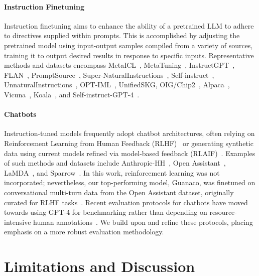 \paragraph{Instruction Finetuning} Instruction finetuning aims to enhance the ability of a pretrained LLM to adhere to directives supplied within prompts. This is accomplished by adjusting the pretrained model using input-output samples compiled from a variety of sources, training it to output desired results in response to specific inputs. Representative methods and datasets encompass MetaICL~\citep{min2021metaicl}, MetaTuning~\citep{zhong2021adapting}, InstructGPT~\citep{ouyang2022training}, FLAN~\citep{wei2021finetuned,chung2022scaling}, PromptSource~\citep{bach2022promptsource}, Super-NaturalInstructions~\citep{wang2022super,sanh2021multitask}, Self-instruct~\citep{wang2022self}, UnnaturalInstructions~\citep{honovich2022unnatural}, OPT-IML~\citep{iyer2022opt}, UnifiedSKG\citep{xie2022unifiedskg}, OIG/Chip2~\citep{laion2023}, Alpaca~\citep{alpaca}, Vicuna~\citep{vicuna2023}, Koala~\citep{koala_blogpost_2023}, and Self-instruct-GPT-4~\citep{peng2023instruction}.

\paragraph{Chatbots} Instruction-tuned models frequently adopt chatbot architectures, often relying on Reinforcement Learning from Human Feedback (RLHF)~\citep{christiano2017deep} or generating synthetic data using current models refined via model-based feedback (RLAIF)~\citep{bai2022constitutional}. Examples of such methods and datasets include Anthropic-HH~\citep{askell2021general,bai2022training}, Open Assistant~\citep{kopf2023openassistant}, LaMDA~\citep{thoppilan2022lamda}, and Sparrow~\citep{glaese2022improving}. In this work, reinforcement learning was not incorporated; nevertheless, our top-performing model, Guanaco, was finetuned on conversational multi-turn data from the Open Assistant dataset, originally curated for RLHF tasks~\citep{kopf2023openassistant}. Recent evaluation protocols for chatbots have moved towards using GPT-4 for benchmarking rather than depending on resource-intensive human annotations~\citep{vicuna2023,peng2023instruction}. We build upon and refine these protocols, placing emphasis on a more robust evaluation methodology.

\section{Limitations and Discussion}

